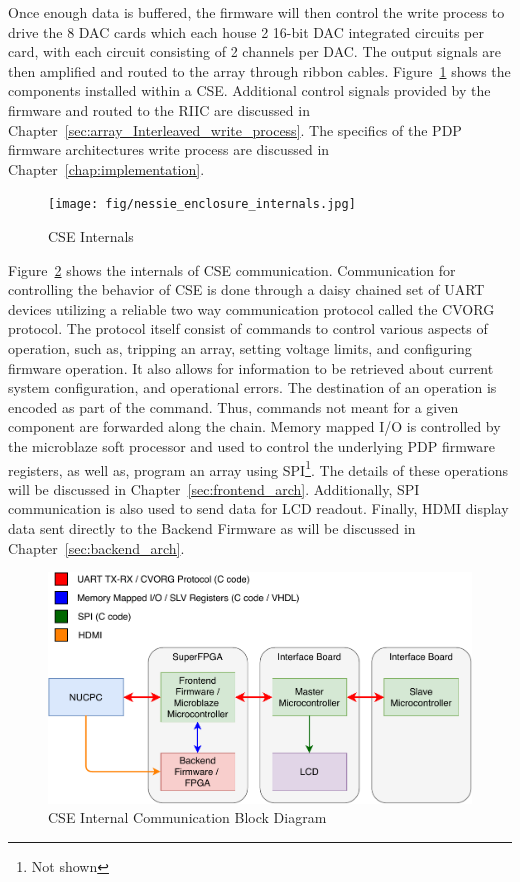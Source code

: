     Once enough data is buffered, the firmware will then control the write process to drive the 8 DAC cards which each house 2 16-bit DAC integrated circuits per card, with each circuit consisting of 2 channels per DAC. The output signals are then amplified and routed to the array through ribbon cables. Figure~\ref{fig:nessie_enclosure_internals} shows the components installed within a CSE. Additional control signals provided by the firmware and routed to the RIIC are discussed in Chapter~\ref{sec:array_Interleaved_write_process}. The specifics of the PDP firmware architectures write process are discussed in Chapter~\ref{chap:implementation}.

    \begin{figure}
        \centering
        \texttt{[image: fig/nessie\_enclosure\_internals.jpg]}
        \caption{CSE Internals}
        \label{fig:nessie_enclosure_internals}
    \end{figure}

    Figure~\ref{fig:cse_comm_block} shows the internals of CSE communication. Communication for controlling the behavior of CSE is done through a daisy chained set of UART devices utilizing a reliable two way communication protocol called the CVORG protocol. The protocol itself consist of commands to control various aspects of operation, such as, tripping an array, setting voltage limits, and configuring firmware operation. It also allows for information to be retrieved about current system configuration, and operational errors. The destination of an operation is encoded as part of the command. Thus, commands not meant for a given component are forwarded along the chain. Memory mapped I/O is controlled by the microblaze soft processor and used to control the underlying PDP firmware registers, as well as, program an array using SPI\footnote{Not shown}. The details of these operations will be discussed in Chapter~\ref{sec:frontend_arch}. Additionally, SPI communication is also used to send data for LCD readout. Finally, HDMI display data sent directly to the Backend Firmware as will be discussed in Chapter~\ref{sec:backend_arch}.

    \begin{figure}
        \centering
        \includegraphics[width=1.0\textwidth]{fig/cse_comm_block.pdf}
        \caption{CSE Internal Communication Block Diagram}
        \label{fig:cse_comm_block}
    \end{figure}

